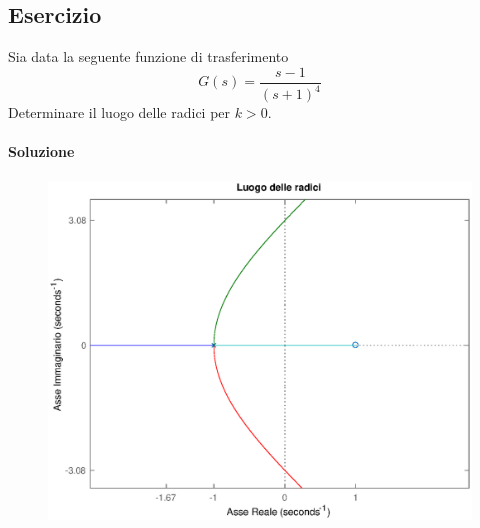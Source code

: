 \subsection{Esercizio}
Sia data la seguente funzione di trasferimento
\[
	G(s) = \frac{s-1}{(s+1)^4}
\]
Determinare il luogo delle radici per \(k>0\).

\paragraph{Soluzione}

\begin{figure}[ht]
	\centering
	\includegraphics[scale=.6]{mod1/assets/rl_ex314}
\end{figure}

